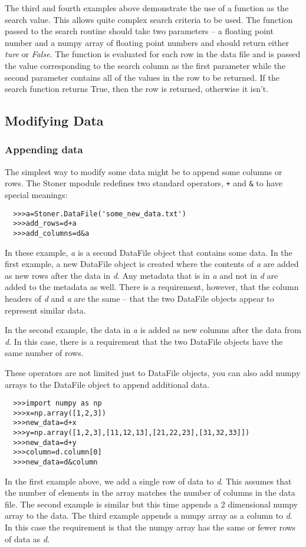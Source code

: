\documentclass[a4paper,11pt]{scrartcl}
\begin{document}
The third and fourth examples above demonstrate the use of a function as the search value. This allows quite complex search criteria to be used. The function passed to the search routine should take two parameters -- a floating point number and a numpy array of floating point numbers and should return either \textit{ture} or \textit{False}. The function is evaluated for each row in the data file and is passed the value corresponding to the search column as the first parameter while the second parameter contains all of the values in the row to be returned. If the search function returns True, then the row is returned, otherwise it isn't.

\subsection{Modifying Data}

\subsubsection{Appending data}

The simplest way to modify some data might be to append some columns or rows. The Stoner mpodule redefines two standard operators, \verb:+: and \verb:&: to have special meanings:
\begin{verbatim}
  >>>a=Stoner.DataFile('some_new_data.txt')
  >>>add_rows=d+a
  >>>add_columns=d&a
\end{verbatim}
In these example, \textit{a} is a second DataFile object that contains some data. In the first example, a new DataFile object is created where the contents of \textit{a} are added as new rows after the data in \textit{d}. Any metadata that is in \textit{a} and not in \textit{d} are added to the metadata as well. There is a requirement, however, that the column headers of \textit{d} and \textit{a} are the same -- \ie that the two DataFile objects appear to represent similar data.

In the second example, the data in \textit{a} is added as new columns after the data from \textit{d}. In this case, there is a requirement that the two DataFile objects have the same number of rows.

These operators are not limited just to DataFile objects, you can also add numpy arrays to the DataFile object to append additional data.
\begin{verbatim}
  >>>import numpy as np
  >>>x=np.array([1,2,3])
  >>>new_data=d+x
  >>>y=np.array([1,2,3],[11,12,13],[21,22,23],[31,32,33]])
  >>>new_data=d+y
  >>>column=d.column[0]
  >>>new_data=d&column
\end{verbatim}
In the first example above, we add a single row of data to \textit{d}. This assumes that the number of elements in the array matches the number of columns in the data file. The second example is similar but this time appends a 2 dimensional numpy array to the data. The third example appends a numpy array as a column to \textit{d}. In this case the requirement is that the numpy array has the same or fewer rows of data as \textit{d}.
\end{document}
